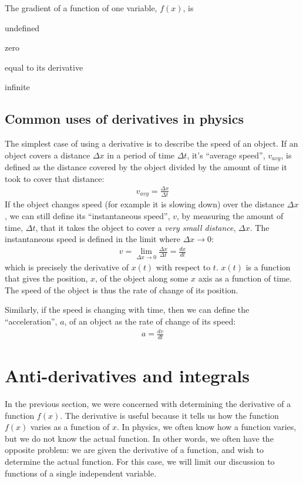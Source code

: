 \begin{checkpoint}
\begin{MCquestion}{The gradient of a function of one variable, $f(x)$, is}
\item undefined
\item zero
\item equal to its derivative  \correct
\item infinite
\end{MCquestion}
\end{checkpoint}

\subsection{Common uses of derivatives in physics}
The simplest case of using a derivative is to describe the speed of an object. If an object covers a distance $\Delta x$ in a period of time $\Delta t$, it's ``average speed'', $v_{avg}$, is defined as the distance covered by the object divided by the amount of time it took to cover that distance:
\begin{align*}
v_{avg} = \frac{\Delta x}{\Delta t}
\end{align*}
If the object changes speed (for example it is slowing down) over the distance $\Delta x$, we can still define its ``instantaneous speed'', $v$, by measuring the amount of time, $\Delta t$, that it takes the object to cover a \textit{very small distance}, $\Delta x$. The instantaneous speed is defined in the limit where $\Delta x \to 0$:
\begin{align*}
v = \lim_{\Delta x\to 0}\frac{\Delta x}{\Delta t}=\frac{dx}{dt}
\end{align*} 
which is precisely the derivative of $x(t)$ with respect to $t$. $x(t)$ is a function that gives the position, $x$, of the object along some $x$ axis as a function of time. The speed of the object is thus the rate of change of its position.

Similarly, if the speed is changing with time, then we can define the ``acceleration'', $a$, of an object as the rate of change of its speed:
\begin{align*}
a = \frac{dv}{dt}
\end{align*}


\section{Anti-derivatives and integrals}\label{sec:calculus:integrals}
In the previous section, we were concerned with determining the derivative of a function $f(x)$. The derivative is useful because it tells us how the function $f(x)$ varies as a function of $x$. In physics, we often know how a function varies, but we do not know the actual function. In other words, we often have the opposite problem: we are given the derivative of a function, and wish to determine the actual function. For this case, we will limit our discussion to functions of a single independent variable.

